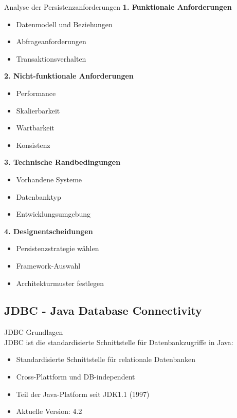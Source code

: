 \begin{KR}{Analyse der Persistenzanforderungen}
\textbf{1. Funktionale Anforderungen}
\begin{itemize}
    \item Datenmodell und Beziehungen
    \item Abfrageanforderungen
    \item Transaktionsverhalten 
\end{itemize}

\textbf{2. Nicht-funktionale Anforderungen}
\begin{itemize}
    \item Performance
    \item Skalierbarkeit
    \item Wartbarkeit
    \item Konsistenz
\end{itemize}

\textbf{3. Technische Randbedingungen}
\begin{itemize}
    \item Vorhandene Systeme
    \item Datenbanktyp
    \item Entwicklungsumgebung
\end{itemize}

\textbf{4. Designentscheidungen}
\begin{itemize}
    \item Persistenzstrategie wählen
    \item Framework-Auswahl
    \item Architekturmuster festlegen
\end{itemize}
\end{KR}

\subsection{JDBC - Java Database Connectivity}

\begin{concept}{JDBC Grundlagen}\\
JDBC ist die standardisierte Schnittstelle für Datenbankzugriffe in Java:
\begin{itemize}
    \item Standardisierte Schnittstelle für relationale Datenbanken
    \item Cross-Plattform und DB-independent
    \item Teil der Java-Platform seit JDK1.1 (1997)
    \item Aktuelle Version: 4.2
\end{itemize}
\end{concept}

